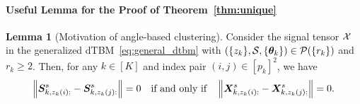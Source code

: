 \documentclass[lettersize,journal]{IEEEtran}
\theoremstyle{definition}
\newtheorem{lem}{Lemma}
\theoremstyle{definition}
\begin{document}
\paragraph{Useful Lemma for the Proof of Theorem~\ref{thm:unique}} 

\begin{lem}[Motivation of angle-based clustering]\label{lem:angle} Consider the signal tensor $\mathcal{X}$ in the generalized dTBM~\eqref{eq:general_dtbm} with $(\{z_k\},\mathcal{S},\{\boldsymbol{\theta}_k\})\in \mathcal{P}(\{r_k\})$ and $r_k \geq 2$. Then, for any $k \in [K]$ and index pair $(i,j)\in[p_k]^2$, we have 
\begin{equation}
    \left\lVert \bm S_{k,z_k(i):}^s -  \bm S_{k,z_k(j):}^s \right\rVert = 0 \quad \text{if and only if} \quad \left\lVert  \bm X_{k, z_k(i):}^s -  \bm X_{k,z_k(j):}^s \right\rVert = 0.
\end{equation}
\end{lem}
\end{document}
